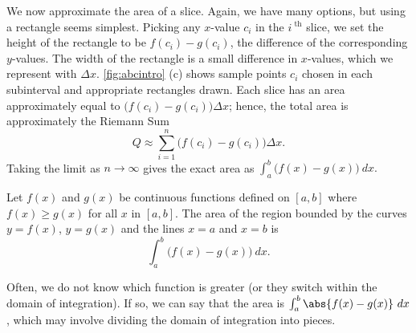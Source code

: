 We now approximate the area of a slice. Again, we have many options, but using a rectangle seems simplest. Picking any $x$-value $c_i$ in the $i^\text{ th}$ slice, we set the height of the rectangle to be $f(c_i)-g(c_i)$, the difference of the corresponding $y$-values. The width of the rectangle is a small difference in $x$-values, which we represent with $\Delta x$. \autoref{fig:abcintro} (c) shows sample points $c_i$ chosen in each subinterval and appropriate rectangles drawn.
Each slice has an area approximately equal to $\bigl(f(c_i)-g(c_i)\bigr)\Delta x$; hence, the total area is approximately the Riemann Sum\vspace{-.5\baselineskip}
\[Q \approx \sum_{i=1}^n \bigl(f(c_i)-g(c_i)\bigr)\Delta x.\]
Taking the limit as $n\to \infty$ gives the exact area as $\int_a^b \bigl(f(x)-g(x)\bigr)\ dx.$

\begin{theorem}\label{thm:areabetweencurves}
Let $f(x)$ and $g(x)$ be continuous functions defined on $[a,b]$ where $f(x)\geq g(x)$ for all $x$ in $[a,b]$. The area of the region bounded by the curves $y=f(x)$, $y=g(x)$ and the lines $x=a$ and $x=b$ is 
\[\int_a^b \bigl(f(x)-g(x)\bigr)\ dx.\]
\end{theorem}

Often, we do not know which function is greater (or they switch within the domain of integration).  If so, we can say that the area is $\int_a^b\abs{f(x)-g(x)}\ dx$, which may involve dividing the domain of integration into pieces.


